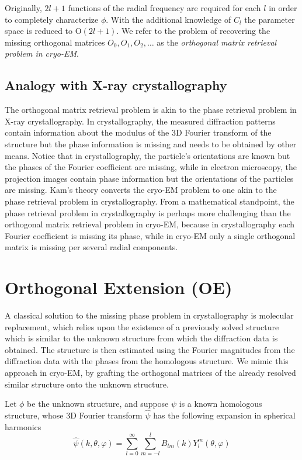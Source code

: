 \documentclass{article}
\begin{document}
Originally, $2l+1$ functions of
the radial frequency are required for each $l$ in order
to completely characterize $\phi$. With the additional knowledge of
$C_l$ the parameter space is reduced
to $\text{O}(2l+1)$. We refer to the problem of recovering the missing orthogonal matrices $O_0,O_1,O_2,\ldots$ as the {\em orthogonal matrix retrieval problem in cryo-EM}.  

\subsection{Analogy with X-ray crystallography}
The orthogonal matrix retrieval problem is akin to the phase retrieval problem in X-ray crystallography. In crystallography,  
the measured diffraction patterns contain information about the modulus of the 3D
Fourier transform of the structure but the phase information is missing and needs to be obtained by other means. Notice that in crystallography,
the particle's orientations are known but
the phases of the Fourier coefficient are missing, while in electron
microscopy, the projection images contain phase information but the orientations of the
particles are missing. Kam's theory converts the cryo-EM problem to one akin to the phase retrieval problem in crystallography. From a mathematical standpoint, the phase retrieval problem in crystallography is perhaps more challenging than the orthogonal matrix retrieval problem in cryo-EM, because in crystallography each Fourier coefficient is missing its phase, while in cryo-EM only a single orthogonal matrix is missing per several radial components.

\section{Orthogonal Extension (OE)}
A classical solution to the missing phase problem in crystallography is
molecular replacement, which relies upon the existence of a previously solved structure which is similar to the unknown structure from which the
diffraction data is obtained. The structure is then estimated using the Fourier magnitudes from the diffraction data with the phases from the homologous structure. We mimic this approach in cryo-EM, by grafting the
orthogonal matrices of the already resolved
similar structure onto the unknown structure. 

Let $\phi$ be the unknown structure, and suppose $\psi$ is a known homologous structure, whose 3D Fourier transform $\hat{\psi}$ has the following expansion in spherical harmonics 
\begin{equation}
\hat{\psi}(k,\theta,\varphi) = \sum_{l=0}^{\infty} \sum_{m=-l}^{l}
B_{lm}(k) Y_l^m (\theta, \varphi)
\end{equation} 
\end{document}
